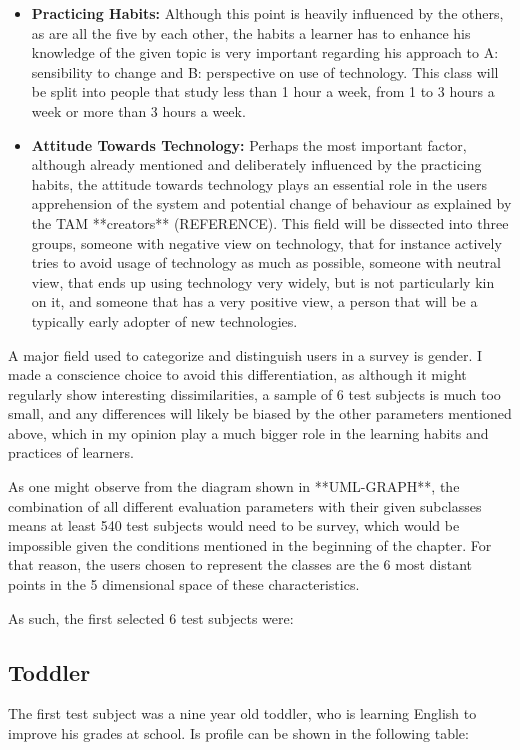 \begin{itemize}
    \item \textbf{Practicing Habits: }
	Although this point is heavily influenced by the others, as are all 
	the five by each other, the habits a learner has to enhance his 
	knowledge of the given topic is very important regarding his approach
	to A: sensibility to change and B: perspective on use of technology.
	This class will be split into people that study less than 1 hour a week,
	from 1 to 3 hours a week or more than 3 hours a week.

    \item \textbf{Attitude Towards Technology: }
	Perhaps the most important factor, although already mentioned and 
	deliberately influenced by the practicing habits, the attitude towards
	technology plays an essential role in the users apprehension of the
	system and potential change of behaviour as explained by the 
	TAM **creators** (REFERENCE).  
	This field will be dissected into three groups, someone with negative 
	view on technology, that for instance actively tries to avoid usage 
	of technology as much as possible, someone with neutral view, that ends
	up using technology very widely, but is not particularly kin on it, and
	someone that has a very positive view, a person that will be a typically
	early adopter of new technologies.

\end{itemize}


A major field used to categorize and distinguish users in a survey is gender.
I made a conscience choice to avoid this differentiation, as although it might
regularly show interesting dissimilarities, a sample of 6 test subjects is much
too small, and any differences will likely be biased by the other parameters 
mentioned above, which in my opinion play a much bigger role in the learning 
habits and practices of learners.


As one might observe from the diagram shown in **UML-GRAPH**, the combination of
all different evaluation parameters with their given subclasses means at least
540 test subjects would need to be survey, which would be impossible given the
conditions mentioned in the beginning of the chapter. For that reason, the users
chosen to represent the classes are the 6 most distant points in the 5 
dimensional space of these characteristics.

As such, the first selected 6 test subjects were: 

\subsection{Toddler}
The first test subject was a nine year old toddler, who is learning English to
improve his grades at school. Is profile can be shown in the following table:

